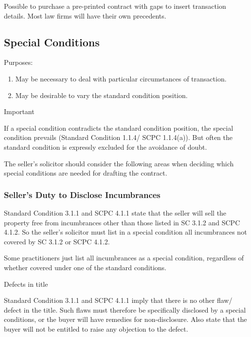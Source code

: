 \documentclass[
]{article}
\providecommand{\tightlist}{%
  \setlength{\itemsep}{0pt}\setlength{\parskip}{0pt}}
\newenvironment{env-8e984a52-6a47-430d-9005-822950744b1a}
{
    \savenotes\tcolorbox[blanker,breakable,left=5pt,borderline west={2pt}{-4pt}{blue}]
}
{
    \endtcolorbox\spewnotes
}
\newenvironment{env-6ddcfa72-79e8-4a6b-8a9a-7daeec113411}
{
    \savenotes\tcolorbox[blanker,breakable,left=5pt,borderline west={2pt}{-4pt}{cyan}]
}
{
    \endtcolorbox\spewnotes
}
\begin{document}
Possible to purchase a pre-printed contract with gaps to insert
transaction details. Most law firms will have their own precedents.

\hypertarget{special-conditions}{%
\subsection{Special Conditions}\label{special-conditions}}

Purposes:

\begin{enumerate}
\tightlist
\item
  May be necessary to deal with particular circumstances of transaction.
\item
  May be desirable to vary the standard condition position.
\end{enumerate}

\begin{env-6ddcfa72-79e8-4a6b-8a9a-7daeec113411}

Important

If a special condition contradicts the standard condition position, the
special condition prevails (Standard Condition 1.1.4/ SCPC 1.1.4(a)).
But often the standard condition is expressly excluded for the avoidance
of doubt.

\end{env-6ddcfa72-79e8-4a6b-8a9a-7daeec113411}

The seller's solicitor should consider the following areas when deciding
which special conditions are needed for drafting the contract.

\hypertarget{sellers-duty-to-disclose-incumbrances}{%
\subsubsection{Seller's Duty to Disclose
Incumbrances}\label{sellers-duty-to-disclose-incumbrances}}

Standard Condition 3.1.1 and SCPC 4.1.1 state that the seller will sell
the property free from incumbrances other than those listed in SC 3.1.2
and SCPC 4.1.2. So the seller's solicitor must list in a special
condition all incumbrances not covered by SC 3.1.2 or SCPC 4.1.2.

Some practitioners just list all incumbrances as a special condition,
regardless of whether covered under one of the standard conditions.

\begin{env-8e984a52-6a47-430d-9005-822950744b1a}

Defects in title

Standard Condition 3.1.1 and SCPC 4.1.1 imply that there is no other
flaw/ defect in the title. Such flaws must therefore be specifically
disclosed by a special conditions, or the buyer will have remedies for
non-disclosure. Also state that the buyer will not be entitled to raise
any objection to the defect.

\end{env-8e984a52-6a47-430d-9005-822950744b1a}
\end{document}
